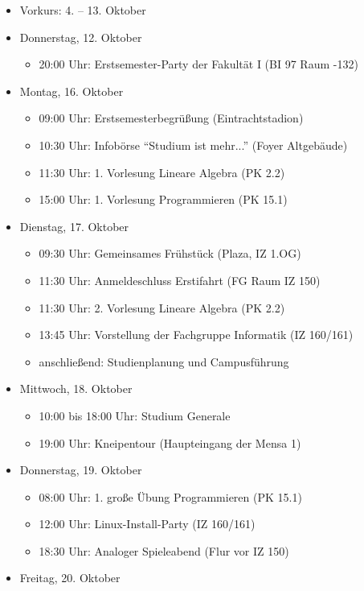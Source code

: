 \begin{itemize}
	\item Vorkurs: 4. – 13. Oktober
	\item Donnerstag, 12. Oktober
	\begin{itemize}
		\item 20:00 Uhr: Erstsemester-Party der Fakultät I (BI 97 Raum -132)
	\end{itemize}
	\item Montag, 16. Oktober
	\begin{itemize}
		\item 09:00 Uhr: Erstsemesterbegrüßung (Eintrachtstadion)
        \item 10:30 Uhr: Infobörse \enquote{Studium ist mehr...} (Foyer Altgebäude)
        \item 11:30 Uhr: 1. Vorlesung Lineare Algebra (PK 2.2)
        \item 15:00 Uhr: 1. Vorlesung Programmieren (PK 15.1)
	\end{itemize}
	\item Dienstag, 17. Oktober
	\begin{itemize}
		\item 09:30 Uhr: Gemeinsames Frühstück (Plaza, IZ 1.OG)
        \item 11:30 Uhr: Anmeldeschluss Erstifahrt (FG Raum IZ 150)
        \item 11:30 Uhr: 2. Vorlesung Lineare Algebra (PK 2.2)
        \item 13:45 Uhr: Vorstellung der Fachgruppe Informatik (IZ 160/161)
        \item anschließend: Studienplanung und Campusführung
	\end{itemize}
	\item Mittwoch, 18. Oktober
	\begin{itemize}
		\item 10:00 bis 18:00 Uhr: Studium Generale
        \item 19:00 Uhr: Kneipentour (Haupteingang der Mensa 1)
	\end{itemize}
	\item Donnerstag, 19. Oktober
	\begin{itemize}
		\item 08:00 Uhr: 1. große Übung Programmieren (PK 15.1)
        \item 12:00 Uhr: Linux-Install-Party (IZ 160/161)
        \item 18:30 Uhr: Analoger Spieleabend (Flur vor IZ 150)
	\end{itemize}
	\item Freitag, 20. Oktober

\end{itemize}
